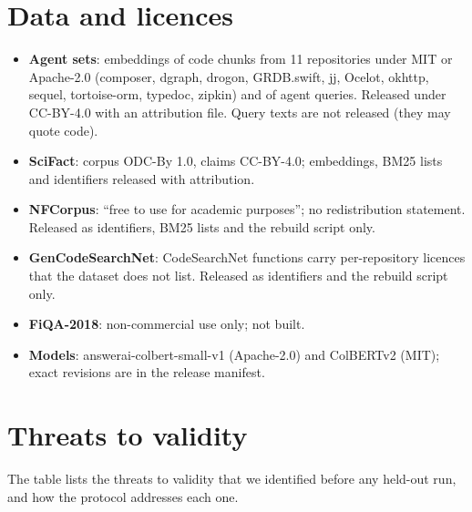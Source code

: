 \section{Data and licences}
\label{app:data}

\begin{itemize}
\item \textbf{Agent sets}: embeddings of code chunks from 11 repositories under MIT or Apache-2.0 (composer, dgraph, drogon, GRDB.swift, jj, Ocelot, okhttp, sequel, tortoise-orm, typedoc, zipkin) and of agent queries. Released under CC-BY-4.0 with an attribution file. Query texts are not released (they may quote code).
\item \textbf{SciFact}: corpus ODC-By 1.0, claims CC-BY-4.0; embeddings, BM25 lists and identifiers released with attribution.
\item \textbf{NFCorpus}: ``free to use for academic purposes''; no redistribution statement. Released as identifiers, BM25 lists and the rebuild script only.
\item \textbf{GenCodeSearchNet}: CodeSearchNet functions carry per-repository licences that the dataset does not list. Released as identifiers and the rebuild script only.
\item \textbf{FiQA-2018}: non-commercial use only; not built.
\item \textbf{Models}: answerai-colbert-small-v1 (Apache-2.0) and ColBERTv2 (MIT); exact revisions are in the release manifest.
\end{itemize}

\section{Threats to validity}
\label{app:threats}

The table lists the threats to validity that we identified before any held-out run, and how the protocol addresses each one.

